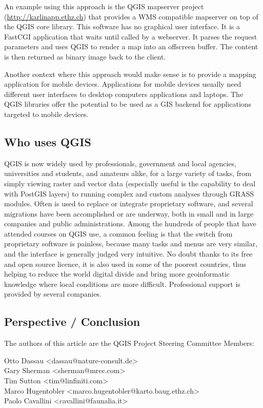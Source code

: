 An example using this approach is the QGIS mapserver project (\url{http://karlinapp.ethz.ch}) that provides a WMS
compatible mapserver on top of the QGIS core library. This software has no 
graphical user interface. It is a FastCGI application that waits until called
by a webserver. It parses the request parameters and uses QGIS to render a map
into an offscreen buffer. The content is then returned as binary image back to
the client.

Another context where this approach would make sense is to provide a mapping
application for mobile devices. Applications for mobile devices usually need
different user interfaces to desktop computers applications and
laptops. The QGIS libraries offer the potential to be used as a GIS backend for 
applications targeted to mobile devices.

\subsection{Who uses QGIS}
QGIS is now widely used by professionals, government and local agencies, universities and students, and amateurs alike, for a large variety of tasks, from simply viewing raster and vector data (especially useful is the capability to deal with PostGIS layers) to running complex and custom analyses through GRASS modules. Often is used to replace or integrate proprietary software, and several migrations have been accomplished or are underway, both in small and in large companies and public administrations. Among the hundreds of people that have attended courses on QGIS use, a common feeling is that the switch from proprietary software is painless, because many tasks and menus are very similar, and the interface is generally judged very intuitive. No doubt thanks to its free and open source licence, it is also used in some of the poorest countries, thus helping to reduce the world digital divide and bring more geoinformatic knowledge where local conditions are more difficult.
Professional support is provided by several companies.

\subsection{Perspective / Conclusion}


The authors of this article are the QGIS Project Steering Committee Members:

Otto Dassau <dassau@nature-consult.de>
\\Gary Sherman <sherman@mrcc.com>
\\Tim Sutton <tim@linfiniti.com>
\\Marco Hugentobler <marco.hugentobler@karto.baug.ethz.ch>
\\Paolo Cavallini <cavallini@faunalia.it>

